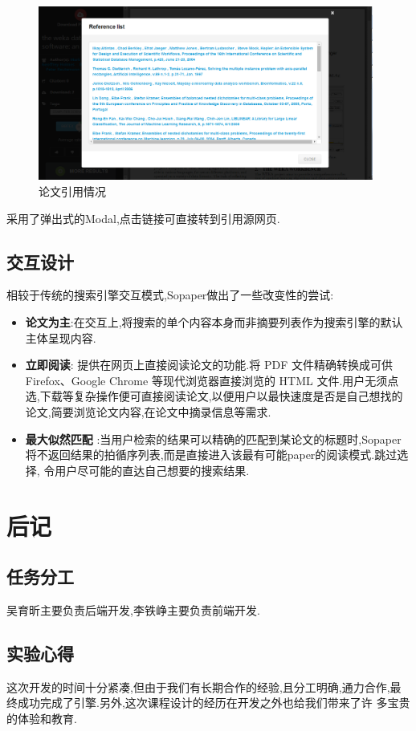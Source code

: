 \begin{figure}[H]
  \small
  \centering
  \includegraphics[width=11cm]{img/reference.png}
  \caption{论文引用情况}
\end{figure}

采用了弹出式的Modal,点击链接可直接转到引用源网页.

\subsection{交互设计}

相较于传统的搜索引擎交互模式,Sopaper做出了一些改变性的尝试:
\begin{itemize}
  \item \textbf{论文为主}:在交互上,将搜索的单个内容本身而非摘要列表作为搜索引擎的默认主体呈现内容.
  \item \textbf{立即阅读}: 提供在网页上直接阅读论文的功能.将 PDF 文件精确转换成可供 Firefox、Google Chrome 等现代浏览器直接浏览的 HTML 文件.用户无须点选,下载等复杂操作便可直接阅读论文,以便用户以最快速度是否是自己想找的论文,简要浏览论文内容,在论文中摘录信息等需求.
  \item \textbf{最大似然匹配} :当用户检索的结果可以精确的匹配到某论文的标题时,Sopaper将不返回结果的拍循序列表,而是直接进入该最有可能paper的阅读模式.跳过选择, 令用户尽可能的直达自己想要的搜索结果.
\end{itemize}


\section{后记}
\subsection{任务分工}
吴育昕主要负责后端开发,李铁峥主要负责前端开发.
\subsection{实验心得}
这次开发的时间十分紧凑,但由于我们有长期合作的经验,且分工明确,通力合作,最终成功完成了引擎.另外,这次课程设计的经历在开发之外也给我们带来了许 多宝贵的体验和教育.


